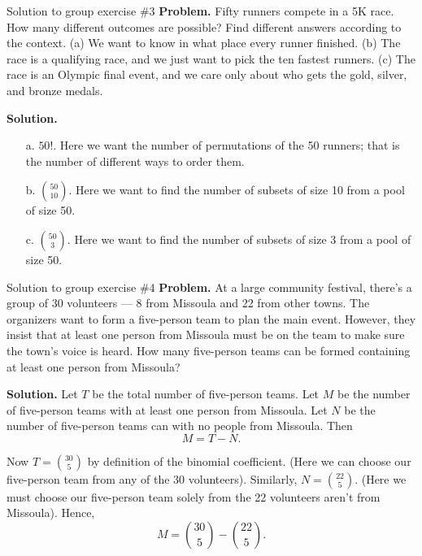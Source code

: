 \documentclass[10pt]{beamer}
\begin{document}
\begin{frame}{Solution to group exercise \#3}
\textbf{Problem.}
Fifty runners compete in a 5K race.  How many different outcomes are possible? Find different answers according to the context. (a) We want to know in what place every runner finished.  (b) The race is a qualifying race, and we just want to pick the ten fastest runners. (c) The race is an Olympic final event, and we care only about who gets the gold, silver, and bronze medals.

\vfill 
\textbf{Solution.}
\begin{itemize}
\item[a.] $50!$. Here we want the number of permutations of the 50 runners; that is the number of different ways to order them. 
\item[b.] $\binom{50}{10}$. Here we want to find the number of subsets of size 10 from a pool of size 50.
\item[c.] $\binom{50}{3}$. Here we want to find the number of subsets of size 3 from a pool of size 50.
\end{itemize}
\end{frame}


\begin{frame}{Solution to group exercise \#4}
\small 
\textbf{Problem.}
At a large community festival, there’s a group of 30 volunteers — 8 from Missoula and 22 from other towns. The organizers want to form a five-person team to plan the main event. However, they insist that at least one person from Missoula must be on the team to make sure the town’s voice is heard. How many five-person teams can be formed containing at least one person from Missoula?

\vfill 
\textbf{Solution.}  Let $T$ be the total number of five-person teams.  Let $M$ be the number of five-person teams with at least one person from Missoula.   Let $N$ be the number of five-person teams can with no people from Missoula.  Then
\[ M = T - N. \]

Now $T=\binom{30}{5}$ by definition of the binomial coefficient. (Here we can choose our five-person team from any of the 30 volunteers). Similarly,  $N=\binom{22}{5}$. (Here we must choose our five-person team solely from the 22 volunteers aren't from Missoula). Hence,
\[M = \binom{30}{5} - \binom{22}{5}. \] 


\end{frame}
\end{document}
